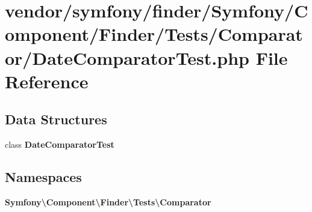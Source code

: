 \section{vendor/symfony/finder/\+Symfony/\+Component/\+Finder/\+Tests/\+Comparator/\+Date\+Comparator\+Test.php File Reference}
\label{_date_comparator_test_8php}
\subsection*{Data Structures}
\begin{DoxyCompactItemize}
\item 
class {\bf Date\+Comparator\+Test}
\end{DoxyCompactItemize}
\subsection*{Namespaces}
\begin{DoxyCompactItemize}
\item 
 {\bf Symfony\textbackslash{}\+Component\textbackslash{}\+Finder\textbackslash{}\+Tests\textbackslash{}\+Comparator}
\end{DoxyCompactItemize}

